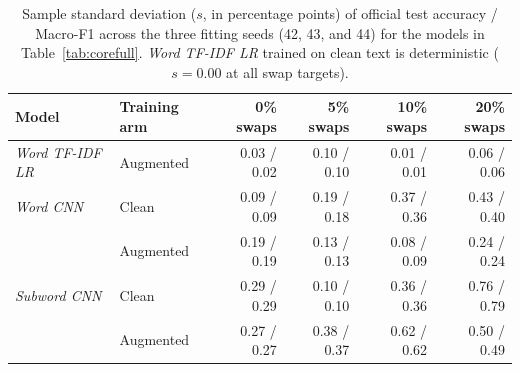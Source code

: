 \begin{table}[H]\centering\small
\begin{tabular}{llrrrr}\toprule
Model & Training arm & 0\% swaps & 5\% swaps & 10\% swaps & 20\% swaps \\\midrule
\textit{Word TF-IDF LR} & Augmented & 0.03 / 0.02 & 0.10 / 0.10 & 0.01 / 0.01 & 0.06 / 0.06 \\
\textit{Word CNN} & Clean & 0.09 / 0.09 & 0.19 / 0.18 & 0.37 / 0.36 & 0.43 / 0.40 \\
 & Augmented & 0.19 / 0.19 & 0.13 / 0.13 & 0.08 / 0.09 & 0.24 / 0.24 \\
\textit{Subword CNN} & Clean & 0.29 / 0.29 & 0.10 / 0.10 & 0.36 / 0.36 & 0.76 / 0.79 \\
 & Augmented & 0.27 / 0.27 & 0.38 / 0.37 & 0.62 / 0.62 & 0.50 / 0.49 \\\bottomrule
\end{tabular}
\caption[Seed standard deviations]{Sample standard deviation ($s$, in percentage points) of official test accuracy / Macro-F1 across the three fitting seeds (42, 43, and 44) for the models in Table~\ref{tab:corefull}. \textit{Word TF-IDF LR} trained on clean text is deterministic ($s = 0.00$ at all swap targets).}\label{tab:core-fit-sd}
\end{table}
